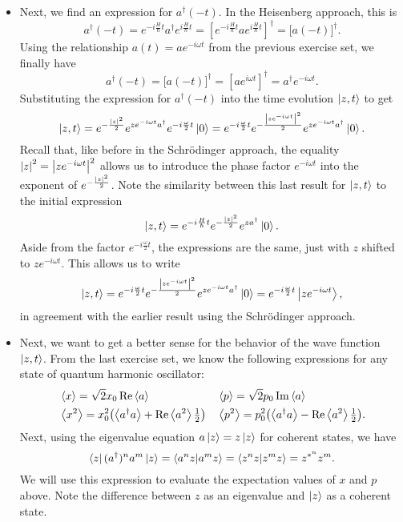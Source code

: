 \documentclass[11pt, a4paper]{article}
\newcommand{\Schro}{Schr\"{o}dinger\xspace}
\newcommand{\tev}{e^{-i\frac{H}{\hbar}t}}  %
\newcommand{\tevp}{e^{i\frac{H}{\hbar}t}}  %
\newcommand{\evb}[1]{\big \langle {#1} \big \rangle}  %
\begin{document}
\begin{itemize}
	\item Next, we find an expression for $ a^{\dagger}(-t) $. In the Heisenberg approach, this is
	\begin{equation*}
		a^{\dagger}(-t) = \tev a^{\dagger} \tevp = \left[\tev a \tevp\right]^{\dagger} = \big[a(-t)\big]^{\dagger}.
	\end{equation*}
	Using the relationship $ a(t) = ae^{-i\omega t} $ from the previous exercise set, we finally have
	\begin{equation*}
		a^{\dagger}(-t) = \big[a(-t)\big]^{\dagger} = \left[ae^{i\omega t}\right]^{\dagger} = a^{\dagger}e^{-i\omega t}.
	\end{equation*}
	Substituting the expression for $  a^{\dagger}(-t)  $ into the time evolution $ \ket{z, t} $ to get
	\begin{equation*}
		\ket{z, t} = e^{-\frac{\abs{z}^{2}}{2}}  e^{ze^{-i\omega t}a^{\dagger}} e^{-i\frac{\omega}{2}t}\ket{0} =  e^{-i\frac{\omega}{2}t} e^{-\frac{\abs{ze^{-i\omega t}}^{2}}{2}} e^{ze^{-i\omega t}a^{\dagger}}\ket{0}.
	\end{equation*}
	Recall that, like before in the \Schro approach, the equality $ \abs{z}^{2} = \abs{ze^{-i\omega t}}^{2}$ allows us to introduce the phase factor $ e^{-i\omega t} $ into the exponent of $ e^{-\frac{\abs{z}^{2}}{2}} $. Note the similarity between this last result for $ \ket{z, t} $ to the initial expression 
	\begin{equation*}
		\ket{z, t} = \tev e^{-\frac{\abs{z}^{2}}{2}}e^{za^{\dagger}}\ket{0}.
	\end{equation*}
	Aside from the factor $ e^{-i\frac{\omega}{2}t} $, the expressions are the same, just with $ z $ shifted to $ ze^{-i\omega t} $. This allows us to write
	\begin{equation*}
		\ket{z, t} =  e^{-i\frac{\omega}{2}t} e^{-\frac{\abs{ze^{-i\omega t}}^{2}}{2}} e^{ze^{-i\omega t}a^{\dagger}}\ket{0} = e^{-i\frac{\omega}{2}t}\ket{ze^{-i\omega t}},
	\end{equation*}
	in agreement with the earlier result using the \Schro approach. 
	
	\item Next, we want to get a better sense for the behavior of the wave function $ \ket{z, t} $. From the last exercise set, we know the following expressions for any state of quantum harmonic oscillator:
	\begin{align*}
		&\ev{x} = \sqrt{2}x_{0} \Re \ev{a} && \ev{p} = \sqrt{2} p_{0} \Im \ev{a}\\
		&\ev{x^{2}} = x_{0}^{2}\big(\evb{a^{\dagger}a} + \Re \ev{a^{2}} \tfrac{1}{2}\big) && \ev{p^{2}} = p_{0}^{2}\big(\evb{a^{\dagger}a} - \Re \ev{a^{2}} \tfrac{1}{2}\big).
	\end{align*}
	Next, using the eigenvalue equation $ a \ket{z} = z \ket{z} $ for coherent states, we have
	\begin{equation*}
		\bra{z}(a^{\dagger})^{n}a^{m}\ket{z} = \braket{a^{n}z}{a^{m}z} = \braket{z^{n}z}{z^{m}z} = z^{*^{n}}z^{m}.
	\end{equation*}
	We will use this expression to evaluate the expectation values of $ x $ and $ p $ above. Note the difference between $ z $ as an eigenvalue and $ \ket{z} $ as a coherent state.
	

\end{itemize}
\end{document}
